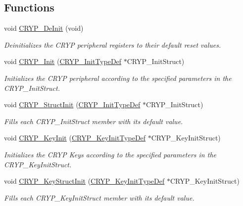 \subsection*{Functions}
\begin{DoxyCompactItemize}
\item 
void \hyperlink{group___c_r_y_p_gae19e54c9910b697e38f6c7577704ffae}{C\-R\-Y\-P\-\_\-\-De\-Init} (void)
\begin{DoxyCompactList}\small\item\em Deinitializes the C\-R\-Y\-P peripheral registers to their default reset values. \end{DoxyCompactList}\item 
void \hyperlink{group___c_r_y_p_ga7b72c458d95581ab0a36be3e017fcf02}{C\-R\-Y\-P\-\_\-\-Init} (\hyperlink{struct_c_r_y_p___init_type_def}{C\-R\-Y\-P\-\_\-\-Init\-Type\-Def} $\ast$C\-R\-Y\-P\-\_\-\-Init\-Struct)
\begin{DoxyCompactList}\small\item\em Initializes the C\-R\-Y\-P peripheral according to the specified parameters in the C\-R\-Y\-P\-\_\-\-Init\-Struct. \end{DoxyCompactList}\item 
void \hyperlink{group___c_r_y_p_ga8fb8ec75fe72d55046c8220825dfe41e}{C\-R\-Y\-P\-\_\-\-Struct\-Init} (\hyperlink{struct_c_r_y_p___init_type_def}{C\-R\-Y\-P\-\_\-\-Init\-Type\-Def} $\ast$C\-R\-Y\-P\-\_\-\-Init\-Struct)
\begin{DoxyCompactList}\small\item\em Fills each C\-R\-Y\-P\-\_\-\-Init\-Struct member with its default value. \end{DoxyCompactList}\item 
void \hyperlink{group___c_r_y_p_gad4baa3865415215cae07c9fbfa131cb9}{C\-R\-Y\-P\-\_\-\-Key\-Init} (\hyperlink{struct_c_r_y_p___key_init_type_def}{C\-R\-Y\-P\-\_\-\-Key\-Init\-Type\-Def} $\ast$C\-R\-Y\-P\-\_\-\-Key\-Init\-Struct)
\begin{DoxyCompactList}\small\item\em Initializes the C\-R\-Y\-P Keys according to the specified parameters in the C\-R\-Y\-P\-\_\-\-Key\-Init\-Struct. \end{DoxyCompactList}\item 
void \hyperlink{group___c_r_y_p_gaeecd86b00d0d0137d97b06108789bcb2}{C\-R\-Y\-P\-\_\-\-Key\-Struct\-Init} (\hyperlink{struct_c_r_y_p___key_init_type_def}{C\-R\-Y\-P\-\_\-\-Key\-Init\-Type\-Def} $\ast$C\-R\-Y\-P\-\_\-\-Key\-Init\-Struct)
\begin{DoxyCompactList}\small\item\em Fills each C\-R\-Y\-P\-\_\-\-Key\-Init\-Struct member with its default value. \end{DoxyCompactList}\item 

\end{DoxyCompactItemize}
